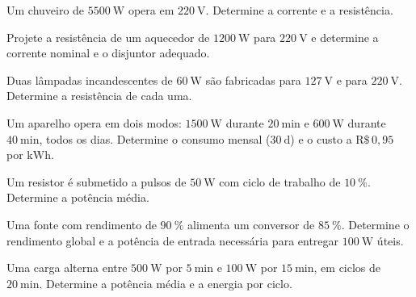 \blocoaplicacao
\begin{questao}[2]{}

Um chuveiro de $\SI{5500}{\watt}$ opera em $\SI{220}{\volt}$. Determine a
corrente e a resistência.


\end{questao}
\begin{questao}[2]{}

Projete a resistência de um aquecedor de $\SI{1200}{\watt}$ para
$\SI{220}{\volt}$ e determine a corrente nominal e o disjuntor adequado.


\end{questao}
\begin{questao}[2]{}

Duas lâmpadas incandescentes de $\SI{60}{\watt}$ são fabricadas para
$\SI{127}{\volt}$ e para $\SI{220}{\volt}$. Determine a resistência de cada
uma.


\end{questao}
\begin{questao}[2]{}

Um aparelho opera em dois modos: $\SI{1500}{\watt}$ durante
$\SI{20}{\minute}$ e $\SI{600}{\watt}$ durante $\SI{40}{\minute}$, todos os
dias. Determine o consumo mensal ($\SI{30}{\day}$) e o custo a
$\mathrm{R\$}\,0{,}95$ por $\si{\kilo\watt\hour}$.


\end{questao}
\begin{questao}[2]{}

Um resistor é submetido a pulsos de $\SI{50}{\watt}$ com ciclo de trabalho de
$\SI{10}{\percent}$. Determine a potência média.


\end{questao}
\begin{questao}[2]{}

Uma fonte com rendimento de $\SI{90}{\percent}$ alimenta um conversor de
$\SI{85}{\percent}$. Determine o rendimento global e a potência de entrada
necessária para entregar $\SI{100}{\watt}$ úteis.


\end{questao}
\begin{questao}[2]{}

Uma carga alterna entre $\SI{500}{\watt}$ por $\SI{5}{\minute}$ e
$\SI{100}{\watt}$ por $\SI{15}{\minute}$, em ciclos de
$\SI{20}{\minute}$. Determine a potência média e a energia por ciclo.


\end{questao}

